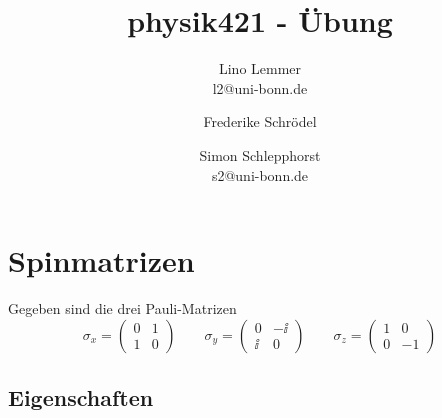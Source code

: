 

\setcounter{thezettel}{10}
\renewcommand\thesection{\arabic{thezettel}.\arabic{section}}



\title{physik421 - Übung }
\author{Lino Lemmer \\ \small{l2@uni-bonn.de} \and Frederike Schrödel \and Simon Schlepphorst\\ \small{s2@uni-bonn.de}}


\maketitle

\section{Spinmatrizen} %
\label{sec:Spinmatrizen}

Gegeben sind die drei Pauli-Matrizen
\[
\sigma_x = \begin{pmatrix} 0 & 1 \\ 1 & 0 \end{pmatrix} \qquad
\sigma_y = \begin{pmatrix} 0 & -\ii \\ \ii & 0 \end{pmatrix} \qquad
\sigma_z = \begin{pmatrix} 1 & 0 \\ 0 & -1 \end{pmatrix}
\]
\subsection{Eigenschaften} %
\label{ssec:Eigenschaften}


